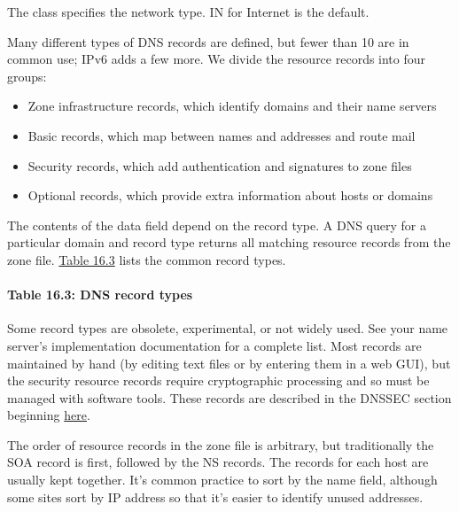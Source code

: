 The {class} specifies the network type. IN for Internet is the default.

Many different types of DNS records are defined, but fewer than 10 are
in common use; IPv6 adds a few more. We divide the resource records into
four groups:

\begin{itemize}
\item
  Zone infrastructure records, which identify domains and their name
  servers
\item
  Basic records, which map between names and addresses and route mail
\item
  Security records, which add authentication and signatures to zone
  files
\item
  Optional records, which provide extra information about hosts or
  domains
\end{itemize}

The contents of the {data} field depend on the record type. A DNS query
for a particular domain and record type returns all matching resource
records from the zone file.
\protect\hyperlink{part0024_split_021.htmlux5cux23_idTextAnchor872}{Table
16.3} lists the common record types.

\paragraph[{Table 16.3: }DNS record types]{\texorpdfstring{{Table 16.3:
}\protect\hypertarget{part0024_split_021.htmlux5cux23_idIndexMarker2066}{}{}\protect\hypertarget{part0024_split_021.htmlux5cux23_idIndexMarker2067}{}{}\protect\hypertarget{part0024_split_021.htmlux5cux23_idTextAnchor872}{}{}DNS
record types}{Table 16.3: DNS record types}}


Some record types are obsolete, experimental, or not widely used. See
your name server's implementation documentation for a complete list.
Most records are maintained by hand (by editing text files or by
entering them in a web GUI), but the security resource records require
cryptographic processing and so must be managed with software tools.
These records are described in the DNSSEC section beginning
\protect\hyperlink{part0024_split_059.htmlux5cux23_idTextAnchor938}{here}.

The order of resource records in the zone file is arbitrary, but
traditionally the SOA record is first, followed by the NS records. The
records for each host are usually kept together. It's common practice to
sort by the {name} field, although some sites sort by IP address so that
it's easier to identify unused addresses.

